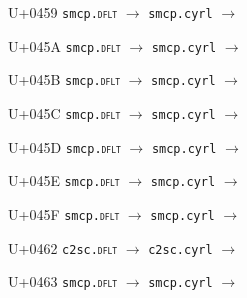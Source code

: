 \documentclass{article}
\begin{document}
\begin{substitutions}
\goodbreak

U+0459  \linebreak
    \texttt{smcp.\textsc{dflt}} $\to$  \linebreak
    \texttt{smcp.cyrl} $\to$  

\goodbreak

U+045A  \linebreak
    \texttt{smcp.\textsc{dflt}} $\to$  \linebreak
    \texttt{smcp.cyrl} $\to$  

\goodbreak

U+045B  \linebreak
    \texttt{smcp.\textsc{dflt}} $\to$  \linebreak
    \texttt{smcp.cyrl} $\to$  

\goodbreak

U+045C  \linebreak
    \texttt{smcp.\textsc{dflt}} $\to$  \linebreak
    \texttt{smcp.cyrl} $\to$  

\goodbreak

U+045D  \linebreak
    \texttt{smcp.\textsc{dflt}} $\to$  \linebreak
    \texttt{smcp.cyrl} $\to$  

\goodbreak

U+045E  \linebreak
    \texttt{smcp.\textsc{dflt}} $\to$  \linebreak
    \texttt{smcp.cyrl} $\to$  

\goodbreak

U+045F  \linebreak
    \texttt{smcp.\textsc{dflt}} $\to$  \linebreak
    \texttt{smcp.cyrl} $\to$  

\goodbreak

U+0462  \linebreak
    \texttt{c2sc.\textsc{dflt}} $\to$  \linebreak
    \texttt{c2sc.cyrl} $\to$  

\goodbreak

U+0463  \linebreak
    \texttt{smcp.\textsc{dflt}} $\to$  \linebreak
    \texttt{smcp.cyrl} $\to$  


\end{substitutions}
\end{document}
